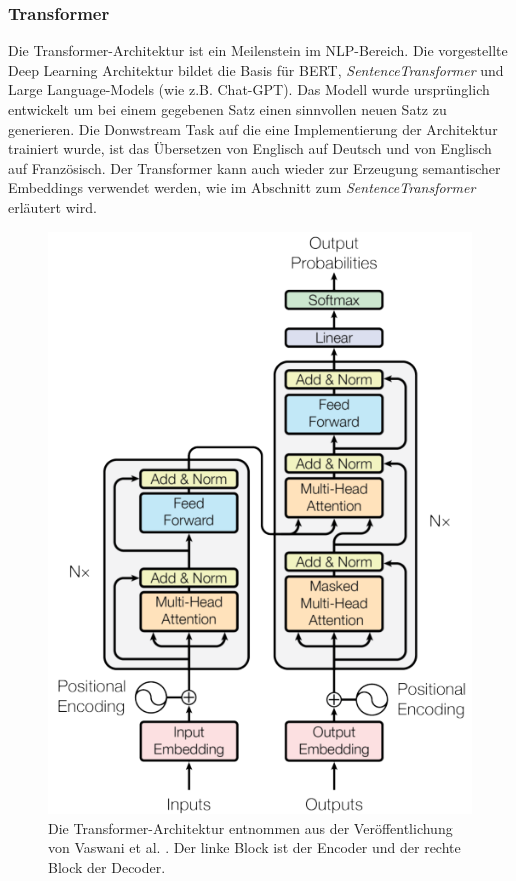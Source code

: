 \documentclass[12pt,letterpaper,ngerman]{article}
\begin{document}
\subsubsection{Transformer}
Die Transformer-Architektur \cite{transformer}
ist ein Meilenstein im NLP-Bereich.
Die vorgestellte Deep Learning Architektur bildet die Basis
für BERT, \textit{SentenceTransformer} und Large Language-Models
(wie z.B. Chat-GPT).
Das Modell wurde ursprünglich entwickelt um bei einem gegebenen
Satz 
einen sinnvollen neuen Satz zu generieren. Die Donwstream Task auf
die eine Implementierung der Architektur trainiert wurde,
ist das Übersetzen von Englisch auf Deutsch und von
Englisch auf Französisch. 
Der Transformer kann auch wieder zur Erzeugung semantischer Embeddings 
verwendet werden, wie im Abschnitt zum \textit{SentenceTransformer} erläutert
wird.
\begin{figure}
  \begin{center}
    \includegraphics[scale=0.5]{abb/transformer-figure.png}
  \end{center}
  \caption{
      Die Transformer-Architektur entnommen aus der Veröffentlichung 
      von Vaswani et al. \cite{transformer}.
      Der linke Block ist der Encoder und der rechte Block der Decoder.
  }
\end{figure} 
\end{document}
